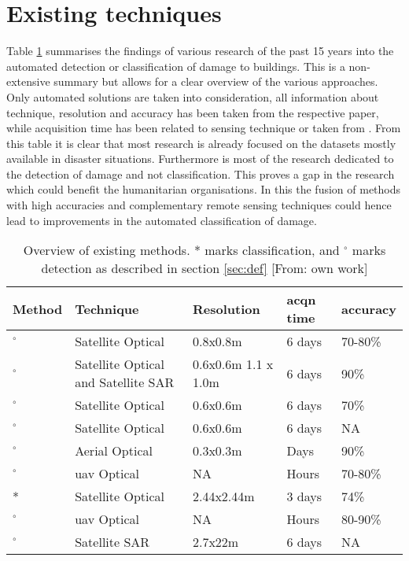 \section{Existing techniques}\label{sec:etech}
Table \ref{tab:emethod} summarises the findings of various research of the past 15 years into the automated detection or classification of damage to buildings. This is a non-extensive summary but allows for a clear overview of the various approaches. Only automated solutions are taken into consideration, all information about technique, resolution and accuracy has been taken from the respective paper, while acquisition time has been related to sensing technique or taken from \citet{Kerle2008}. From this table it is clear that most research is already focused on the datasets mostly available in disaster situations. Furthermore is most of the research dedicated to the detection of damage and not classification. This proves a gap in the research which could benefit the humanitarian organisations. In this the fusion of methods with high accuracies and complementary remote sensing techniques could hence lead to improvements in the automated classification of damage.

\begin{table} [h]
	\centering
	\begin{footnotesize}
		\begin{tabular}{p{3cm}p{2.75cm}p{1.375cm}ll}
			\toprule
			Method & Technique & Resolution & acqn time & accuracy \\
			\midrule
			\citep{Antonietta2015}$^{\circ}$ & Satellite Optical & 0.8x0.8m & 6 days & 70-80\%\\
			\citep{Brunner2010}$^{\circ}$ & Satellite Optical and Satellite SAR & 0.6x0.6m 1.1 x 1.0m & 6 days & 90\%\\
			\citep{Li2017}$^{\circ}$ & Satellite Optical & 0.6x0.6m & 6 days & 70\%\\
			\citep{Martha2015}$^{\circ}$ & Satellite Optical & 0.6x0.6m & 6 days & NA\\
			\citep{Menderes2015}$^{\circ}$ & Aerial Optical & 0.3x0.3m  & Days &90\%\\
			\citep{Ozisik2004}$^{\circ}$ & \ac{uav} Optical & NA  & Hours & 70-80\%\\
			\citep{Samadzadegan2005}* & Satellite Optical & 2.44x2.44m  & 3 days & 74\%\\
			\citep{Vetrivel2016b}$^{\circ}$ & \ac{uav} Optical & NA  & Hours & 80-90\%\\
			\citep{Yun2015}$^{\circ}$ & Satellite SAR & 2.7x22m  & 6 days & NA\\
			\bottomrule
		\end{tabular}
	\end{footnotesize}
	\caption{Overview of existing methods. * marks classification, and $^{\circ}$ marks detection as described in section \ref{sec:def} [From: own work]}
	\label{tab:emethod}
\end{table}


